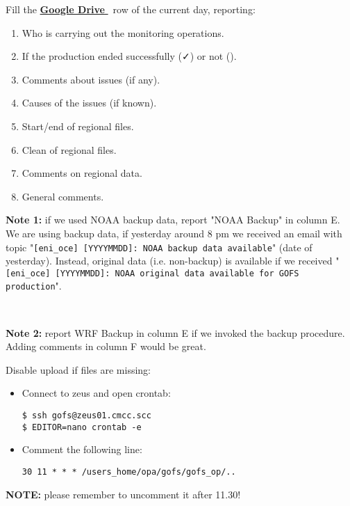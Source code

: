 \documentclass[twocolumn,8pt]{article}
\begin{document}
\begin{mdframed}[frametitle=(B)\ -- At 9 am]

Fill the \href{https://docs.google.com/spreadsheets/d/1XrbzNdr-K6jtwD-tTdRAlaO6S9hy3aSgxQ-OCmYEfL0/edit#gid=1550543264}{\textbf{Google Drive \faExternalLink}}\ row of the current day, reporting:

\begin{enumerate}[col.\ A:\ , left=0.25cm, start=3,align=parleft]\itemsep0pt
    \item Who is carrying out the monitoring operations.
    \item If the production ended successfully (\faCheck) or not (\faTimes).
    \item Comments about issues (if any).
    \item Causes of the issues (if known).
    \addtocounter{enumi}{1}
    \item Start/end of regional files.
    \item Clean of regional files.
    \item Comments on regional data.
    \item General comments.
\end{enumerate}

\textbf{Note 1:} if we used NOAA backup data, report "NOAA Backup" in column E. We are using backup data, if yesterday around 8 pm we received an email with topic "\texttt{[eni\_oce] [YYYYMMDD]: NOAA backup data available}" (date of yesterday). Instead, original data (i.e. non-backup) is available if we received "\texttt{[eni\_oce] [YYYYMMDD]: NOAA original data available for GOFS production}".

\

\textbf{Note 2:} report WRF Backup in column E if we invoked the backup procedure. Adding comments in column F would be great.

\end{mdframed} 

\begin{mdframed}[frametitle=(D)\ -- Before 11.30 am]

Disable upload if files are missing:

\begin{itemize}\itemsep0pt
    \item Connect to zeus and open crontab:
\begin{lstlisting}
$ ssh gofs@zeus01.cmcc.scc
$ EDITOR=nano crontab -e
    \end{lstlisting}
    
    \item Comment the following line:
    \begin{lstlisting}
30 11 * * * /users_home/opa/gofs/gofs_op/..
    \end{lstlisting}
\end{itemize}

\textbf{NOTE:} please remember to uncomment it after 11.30!

\end{mdframed} 
\end{document}
